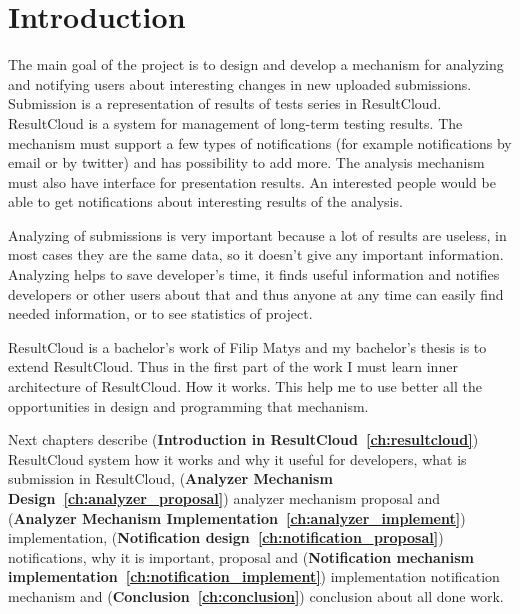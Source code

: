 
\chapter{Introduction}

The main goal of the project is to design and develop a mechanism for analyzing and notifying users about interesting changes in new uploaded submissions. Submission is a representation of results of tests series in ResultCloud. ResultCloud is a system for management of long-term testing results. The mechanism must support a few types of notifications (for example notifications by email or by twitter) and has possibility to add more. The analysis mechanism must also have interface for presentation results. An interested people would be able to get notifications about interesting results of the analysis.

Analyzing of submissions is very important because a lot of results are useless, in most cases they are the same data, so it doesn't give any important information. Analyzing helps to save developer's time, it finds useful information and notifies developers or other users about that and thus anyone at any time can easily find needed information, or to see statistics of project.

ResultCloud is a bachelor's work of Filip Matys and my bachelor's thesis is to extend ResultCloud. Thus in the first part of the work I must learn inner architecture of ResultCloud. How it works. This help me to use better all the opportunities in design and programming that mechanism.

Next chapters describe (\textbf{Introduction in ResultCloud\ \ref{ch:resultcloud}}) ResultCloud system how it works and why it useful for developers, what is submission in ResultCloud, (\textbf{Analyzer Mechanism Design\ \ref{ch:analyzer_proposal}}) analyzer mechanism proposal and (\textbf{Analyzer Mechanism Imple\-me\-nta\-tion\ \ref{ch:analyzer_implement}}) implementation, (\textbf{Notification design\ \ref{ch:notification_proposal}}) notifications, why it is important, proposal and (\textbf{Notification mechanism implementation\ \ref{ch:notification_implement}}) implementation notification mechanism and (\textbf{Conclusion\ \ref{ch:conclusion}}) conclusion about all done work.

